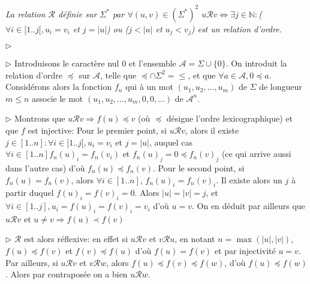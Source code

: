 \documentclass{scrartcl}
\begin{document}
			\prop \textsl{La relation $\mathcal{R}$ définie sur $\Sigma^*$ par $\forall (u,v)\in(\Sigma^*)^2$
			$u\mathcal{R}v \Leftrightarrow \exists j \in \mathbb{N}: $($\forall i \in [1..j[, u_i = v_i$ et $j=|u|$) ou 
			($j < |u|$ et $u_j < v_j$) est un relation d'ordre.}
			\begin{labeling}{$\triangleright$}
				\item [$\triangleright$] Introduisons le caractère nul 0 et l'ensemble $\mathcal{A} = \Sigma \cup \{0\}$.
					On introduit la relation d'ordre $\preceq$ sur $\mathcal{A}$, telle que $\preceq\cap\Sigma^2 = \leq$, et 
					que $\forall a \in \mathcal{A}, 0 \preceq a$.
					Considérons alors la fonction $f_n$ qui à un mot $(u_1,u_2,...,u_m)$ de $\Sigma$ de longueur $m \leq n$ associe
					le mot $(u_1,u_2,...,u_m,0,0,...)$ de $\mathcal{A}^n$.
				\item [$\triangleright$] Montrons que $u \mathcal{R}v \Rightarrow f(u) \preceq v$ (où $\preceq$ désigne l'ordre lexicographique) 
					et que $f$ est injective:
					Pour le premier point, si $u \mathcal{R} v$, alors il existe $j \in [1..n] : \forall i \in [1..j[, u_i = v_i$ et $j=|u|$,
					auquel cas $\forall i \in [1..n] f_n(u)_i = f_n(v_i)$ et $f_n(u)_j = 0 \preceq f_n(v)_j$ (ce qui arrive aussi dans l'autre cas)
					d'où $f_n(u) \preceq f_n(v)$.
					Pour le second point, si $f_n(u) = f_n(v)$, alors $\forall i \in [1..n]$, $f_n(u)_i = f_n(v)_i$.
					Il existe alors un $j$ à partir duquel $f(u)_i = f(v)_i = 0$. Alors $|u|=|v|=j$, 
					et $\forall i \in [1..j], u_i=f(u)_i = f(v)_i = v_i$ d'où $u=v$.
					On en déduit par ailleurs que $u\mathcal{R}v$ et $u\neq v \Rightarrow f(u) \prec f(v)$
				\item [$\triangleright$] $\mathcal{R}$ est alors réflexive: en effet si $u\mathcal{R}v$ et $v\mathcal{R}u$,
					en notant $n=\max(|u|,|v|)$, $f(u) \preceq f(v)$ et $f(v) \preceq f(u)$ d'où $f(u)=f(v)$ et par injectivité 
					$u=v$. Par ailleurs, si $u\mathcal{R}v$ et $v\mathcal{R}w$, alors $f(u) \preceq f(v) \preceq f(w)$, d'où 
					$f(u) \preceq f(w)$. Alors par contraposée on a bien $u\mathcal{R}w$. 
			\end{labeling}
\end{document}
